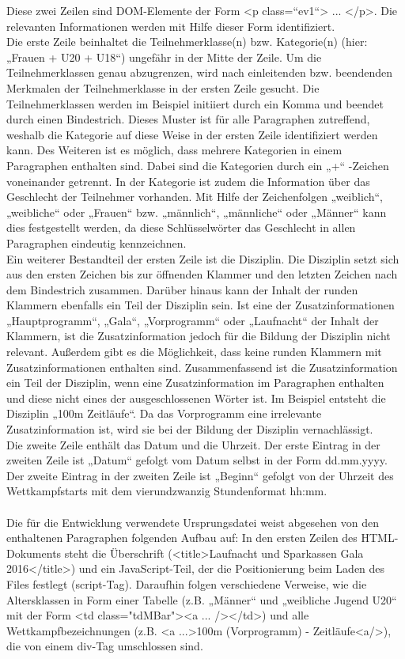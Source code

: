 Diese zwei Zeilen sind DOM-Elemente der Form <p class=“ev1“> ... </p>. Die relevanten Informationen werden mit Hilfe dieser Form identifiziert. \\
Die erste Zeile beinhaltet die Teilnehmerklasse(n) bzw. Kategorie(n) (hier: „Frauen + U20 + U18“) ungefähr in der Mitte der Zeile. Um die Teilnehmerklassen genau abzugrenzen, wird nach einleitenden bzw. beendenden Merkmalen der Teilnehmerklasse in der ersten Zeile gesucht. Die Teilnehmerklassen werden im Beispiel initiiert durch ein Komma und beendet durch einen Bindestrich. Dieses Muster ist für alle Paragraphen zutreffend, weshalb die Kategorie auf diese Weise in der ersten Zeile identifiziert werden kann. Des Weiteren ist es möglich, dass mehrere Kategorien in einem Paragraphen enthalten sind. Dabei sind die Kategorien durch ein „+“ -Zeichen voneinander getrennt. 
In der Kategorie ist zudem die Information über das Geschlecht der Teilnehmer vorhanden. Mit Hilfe der Zeichenfolgen „weiblich“, „weibliche“ oder „Frauen“ bzw. „männlich“, „männliche“ oder „Männer“ kann dies festgestellt werden, da diese Schlüsselwörter das Geschlecht in allen Paragraphen eindeutig kennzeichnen. \\
Ein weiterer Bestandteil der ersten Zeile ist die Disziplin. Die Disziplin setzt sich aus den ersten Zeichen bis zur öffnenden Klammer und den letzten Zeichen nach dem Bindestrich zusammen.
Darüber hinaus kann der Inhalt der runden Klammern ebenfalls ein Teil der Disziplin sein. Ist eine der Zusatzinformationen „Hauptprogramm“, „Gala“, „Vorprogramm“ oder „Laufnacht“ der Inhalt der Klammern, ist die Zusatzinformation jedoch für die Bildung der Disziplin nicht relevant. Außerdem gibt es die Möglichkeit, dass keine runden Klammern mit Zusatzinformationen enthalten sind. Zusammenfassend ist die Zusatzinformation ein Teil der Disziplin, wenn eine Zusatzinformation im Paragraphen enthalten und diese nicht eines der ausgeschlossenen Wörter ist.
Im Beispiel entsteht die Disziplin „100m Zeitläufe“. Da das Vorprogramm eine irrelevante Zusatzinformation ist, wird sie bei der Bildung der Disziplin vernachlässigt.
\\
Die zweite Zeile enthält das Datum und die Uhrzeit. Der erste Eintrag in der zweiten Zeile ist „Datum“ gefolgt vom Datum selbst in der Form dd.mm.yyyy. Der zweite Eintrag in der zweiten Zeile ist „Beginn“ gefolgt von der Uhrzeit des Wettkampfstarts mit dem vierundzwanzig Stundenformat hh:mm.\\
\\
Die für die Entwicklung verwendete Ursprungsdatei weist abgesehen von den enthaltenen Paragraphen folgenden Aufbau auf: In den ersten Zeilen des HTML-Dokuments steht die Überschrift (<title>Laufnacht und Sparkassen Gala 2016</title>) und ein JavaScript-Teil, der die Positionierung beim Laden des Files festlegt (script-Tag). Daraufhin folgen verschiedene Verweise, wie die Altersklassen in Form einer Tabelle (z.B. „Männer“ und „weibliche Jugend U20“ mit der Form <td class="tdMBar"><a ... /></td>) und alle Wettkampfbezeichnungen (z.B. <a ...>100m (Vorprogramm) - Zeitläufe<a/>), die von einem div-Tag umschlossen sind. 
